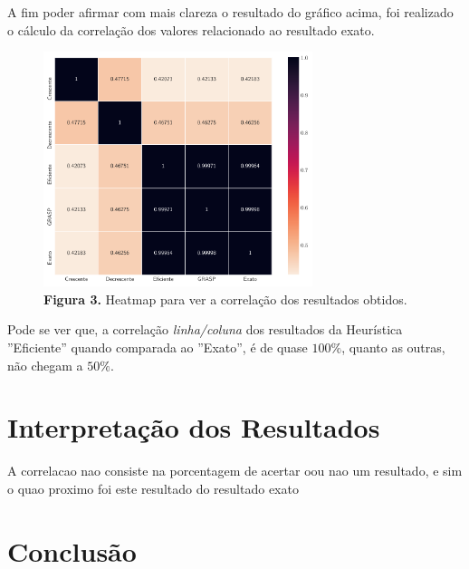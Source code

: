 \documentclass[a4paper, 12pt]{article}
\begin{document}
A fim poder afirmar com mais clareza o resultado do gráfico acima, foi realizado o cálculo da correlação dos valores 
relacionado ao resultado exato.
\begin{figure}[h]
    \centering
    \includegraphics[width=0.7\textwidth]{../imgs/heatmap.pdf}
    \caption{\textbf{Figura 3.} Heatmap para ver a correlação dos resultados obtidos.}
    \label{heatmap}
\end{figure}

Pode se ver que, a correlação \textit{linha/coluna} dos resultados da Heurística ''Eficiente'' quando comparada ao ''Exato'', é de quase $100\%$,
quanto as outras, não chegam a $50\%$.

\section{Interpretação dos Resultados}
A correlacao nao consiste na porcentagem de acertar oou nao um resultado, e sim o quao proximo foi este resultado do resultado exato

\section{Conclusão}

{}

\end{document}
